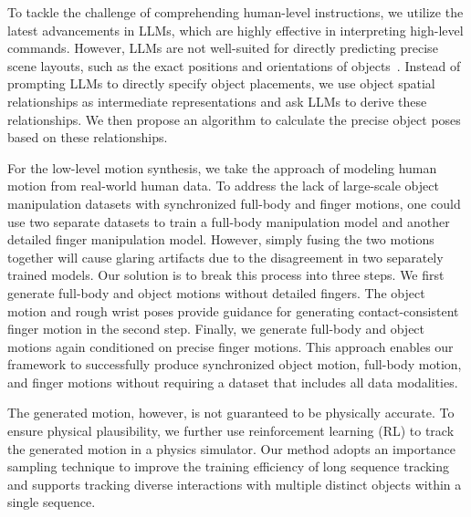 To tackle the challenge of comprehending human-level instructions, we utilize the latest advancements in LLMs, which are highly effective in interpreting high-level commands\cite{openai2023gpt, liu2024visual}.
However, LLMs are not well-suited for directly predicting precise scene layouts, such as the exact positions and orientations of objects~\cite{aguina2024open, hong20233d}.
Instead of prompting LLMs to directly specify object placements, we use object spatial relationships as intermediate representations and ask LLMs to derive these relationships. We then propose an algorithm to calculate the precise object poses based on these relationships.

For the low-level motion synthesis, we take the approach of modeling human motion from real-world human data. To address the lack of large-scale object manipulation datasets with synchronized full-body and finger motions, one could use two separate datasets to train a full-body manipulation model and another detailed finger manipulation model. 
However, simply fusing the two motions together will cause glaring artifacts due to the disagreement in two separately trained models.
Our solution is to break this process into three steps.
We first generate full-body and object motions without detailed fingers. The object motion and rough wrist poses provide guidance for generating contact-consistent finger motion in the second step. Finally, we generate full-body and object motions again conditioned on precise finger motions. This approach enables our framework to successfully produce synchronized object motion, full-body motion, and finger motions without requiring a dataset that includes all data modalities.

The generated motion, however, is not guaranteed to be physically accurate.
To ensure physical plausibility, we further use reinforcement learning (RL) to track the generated motion in a physics simulator. 
Our method adopts an importance sampling technique to improve the training efficiency of long sequence tracking and supports tracking diverse interactions with multiple distinct objects within a single sequence.

